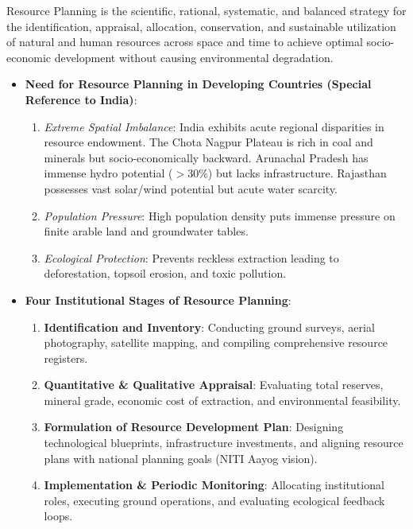 \documentclass[11pt,a4paper]{article}
\begin{document}
\begin{defbox}
Resource Planning is the scientific, rational, systematic, and balanced strategy for the identification, appraisal, allocation, conservation, and sustainable utilization of natural and human resources across space and time to achieve optimal socio-economic development without causing environmental degradation.
\end{defbox}

\begin{itemize}[leftmargin=*]
  \item \textbf{Need for Resource Planning in Developing Countries (Special Reference to India)}:
  \begin{enumerate}
    \item \textit{Extreme Spatial Imbalance}: India exhibits acute regional disparities in resource endowment. The Chota Nagpur Plateau is rich in coal and minerals but socio-economically backward. Arunachal Pradesh has immense hydro potential ($>30\%$) but lacks infrastructure. Rajasthan possesses vast solar/wind potential but acute water scarcity.
    \item \textit{Population Pressure}: High population density puts immense pressure on finite arable land and groundwater tables.
    \item \textit{Ecological Protection}: Prevents reckless extraction leading to deforestation, topsoil erosion, and toxic pollution.
  \end{enumerate}

  \item \textbf{Four Institutional Stages of Resource Planning}:
  \begin{enumerate}
    \item \textbf{Identification and Inventory}: Conducting ground surveys, aerial photography, satellite mapping, and compiling comprehensive resource registers.
    \item \textbf{Quantitative \& Qualitative Appraisal}: Evaluating total reserves, mineral grade, economic cost of extraction, and environmental feasibility.
    \item \textbf{Formulation of Resource Development Plan}: Designing technological blueprints, infrastructure investments, and aligning resource plans with national planning goals (NITI Aayog vision).
    \item \textbf{Implementation \& Periodic Monitoring}: Allocating institutional roles, executing ground operations, and evaluating ecological feedback loops.
  \end{enumerate}
\end{itemize}
\end{document}

